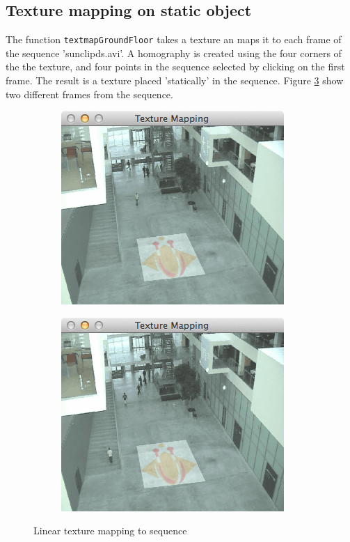 \documentclass[a4paper,11pt]{article}
\begin{document}
\subsection*{Texture mapping on static object}
The function \texttt{textmapGroundFloor} takes a texture an maps it to each frame of the sequence 'sunclipds.avi'. A homography is created using the four corners of the the texture, and four points in the sequence selected by clicking on the first frame. The result is a texture placed 'statically' in the sequence. Figure \ref{fig:floor} show two different frames from the sequence.

\begin{figure}[H]
\centering
\begin{subfigure}{.4\textwidth}
  \centering
  \includegraphics[width=0.8\linewidth]{groundfloor1}
  \label{fig:floor1}
\end{subfigure}
\begin{subfigure}{.4\textwidth}
  \centering
  \includegraphics[width=0.8\linewidth]{groundfloor2}
  \label{fig:floor2}
\end{subfigure}
\caption{Linear texture mapping to sequence}
\label{fig:floor}
\end{figure}
\end{document}

